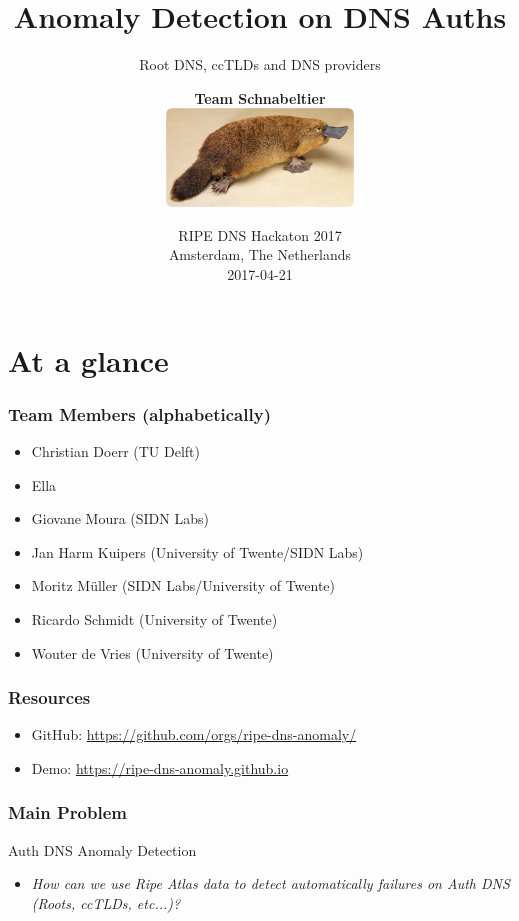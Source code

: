 \documentclass[serif]{beamer}
\title{Anomaly Detection on DNS Auths }
\subtitle{Root DNS, ccTLDs and DNS providers}
\author[\large \textbf{Team  Schnabeltier}

]
{\large \textbf{Team  Schnabeltier}\\
\vspace{0.5cm}
\includegraphics[width=5cm]{fig/Schnabeltier.jpg}
}
\date[IETF98] %
{RIPE DNS Hackaton 2017\\Amsterdam, The Netherlands\\
2017-04-21}
\begin{document}
\frame{\titlepage}

\section{At a glance}

\begin{frame}
	\frametitle{Team Members (alphabetically)}
	
	\begin{itemize}
	\item Christian Doerr (TU Delft)
	\item Ella 
	\item Giovane Moura (SIDN Labs)
	\item Jan Harm Kuipers (University of Twente/SIDN Labs)
	\item Moritz M\"uller (SIDN Labs/University of Twente)
	\item Ricardo Schmidt (University of Twente)
	\item Wouter de Vries (University of Twente)
	\end{itemize}


\end{frame}

\begin{frame}
	\frametitle{Resources}
	
	\begin{itemize}
	  \item GitHub: \url{https://github.com/orgs/ripe-dns-anomaly/}
	  \item Demo: \url{https://ripe-dns-anomaly.github.io}
	\end{itemize}


\end{frame}



\begin{frame}
	\frametitle{Main Problem}
	
	\begin{block}{Auth DNS Anomaly Detection}
	\begin{itemize}
	 \item \textit{How can we use Ripe Atlas data to detect automatically 
failures on Auth DNS (Roots, ccTLDs, etc...)?}
	\end{itemize}

	\end{block}

\end{frame}
\end{document}
